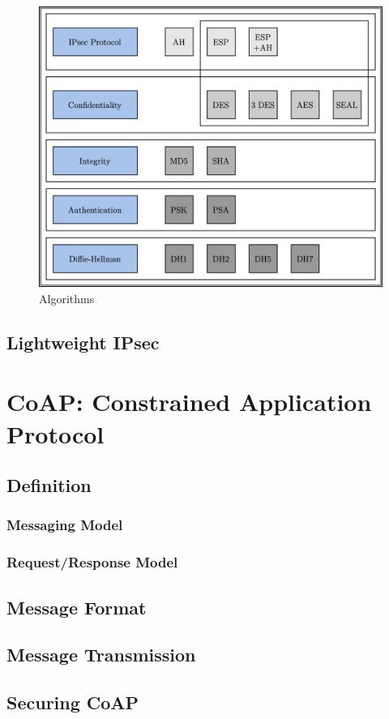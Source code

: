 \documentclass[11pt]{book}
\begin{document}
\begin{figure}[H]
	\centering
	\includegraphics [scale=0.175] {summary.png}
	\caption{Algorithms}
\end{figure}
\section{Lightweight IPsec}
\chapter{CoAP: Constrained Application Protocol}
\section{Definition}
\subsection{Messaging Model}
\subsection{Request/Response Model}
\section{Message Format}
\section{Message Transmission}
\section{Securing CoAP}
\end{document}

